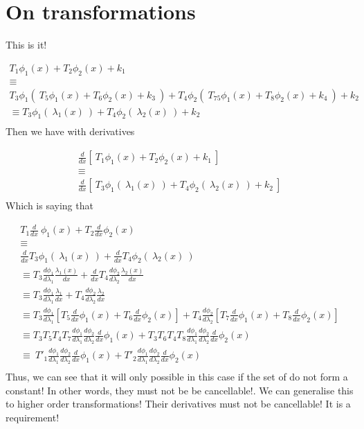 \documentclass[11pt]{article}
\begin{document}
\section{On transformations}
This is it!

\begin{gather*}
    T_{1} \phi _{1}( x) +T_{2} \phi _{2}( x) +k_{1}\\
    \equiv \\
    T_{3} \phi _{1}( \ T_{5} \phi _{1}( x) +T_{6} \phi _{2}( x) +k_{3} \ ) +T_{4} \phi _{2}( \ T_{75} \phi _{1}( x) +T_{8} \phi _{2}( x) +k_{4} \ ) +k_{2}\\
    \equiv T_{3} \phi _{1}( \ \lambda _{1}( x) \ ) +T_{4} \phi _{2}( \ \lambda _{2}( x) \ ) +k_{2}\\
\end{gather*}
Then we have with derivatives

\begin{gather*}
    \frac{d}{dx}[ \ T_{1} \phi _{1}( x) +T_{2} \phi _{2}( x) +k_{1} \ ]\\
    \equiv \\
    \frac{d}{dx}[ \ T_{3} \phi _{1}( \ \lambda _{1}( x) \ ) +T_{4} \phi _{2}( \ \lambda _{2}( x) \ ) +k_{2} \ ]\\
\end{gather*}
Which is saying that

\begin{gather*}
    T_{1}\frac{d}{dx} \ \phi _{1}( x) +T_{2}\frac{d}{dx} \phi _{2}( x)\\
    \equiv \\
    \frac{d}{dx} T_{3} \phi _{1}( \ \lambda _{1}( x) \ ) +\frac{d}{dx} T_{4} \phi _{2}( \ \lambda _{2}( x) \ )\\
    \equiv T_{3}\frac{d\phi _{1}}{d\lambda _{1}}\frac{\lambda _{1}( x)}{dx} +\frac{d}{dx} T_{4}\frac{d\phi _{2}}{d\lambda _{2}}\frac{\lambda _{2}( x)}{dx}\\
    \equiv T_{3}\frac{d\phi _{1}}{d\lambda _{1}}\frac{\lambda _{1}}{dx} +T_{4}\frac{d\phi _{2}}{d\lambda _{2}}\frac{\lambda _{2}}{dx}\\
    \equiv T_{3}\frac{d\phi _{1}}{d\lambda _{1}}\left[ T_{5}\frac{d}{dx} \phi _{1}( x) +T_{6}\frac{d}{dx} \phi _{2}( x)\right] +T_{4}\frac{d\phi _{2}}{d\lambda _{2}}\left[ T_{7}\frac{d}{dx} \phi _{1}( x) +T_{8}\frac{d}{dx} \phi _{2}( x)\right]\\
    \equiv T_{3} T_{5} T_{4} T_{7}\frac{d\phi _{1}}{d\lambda _{1}}\frac{d\phi _{2}}{d\lambda _{2}}\frac{d}{dx} \phi _{1}( x) +T_{3} T_{6} T_{4} T_{8}\frac{d\phi _{1}}{d\lambda _{1}}\frac{d\phi _{2}}{d\lambda _{2}}\frac{d}{dx} \phi _{2}( x)\\
    \equiv \ T'_{1}\frac{d\phi _{1}}{d\lambda _{1}}\frac{d\phi _{2}}{d\lambda _{2}}\frac{d}{dx} \phi _{1}( x) +T'_{2}\frac{d\phi _{1}}{d\lambda _{1}}\frac{d\phi _{2}}{d\lambda _{2}}\frac{d}{dx} \phi _{2}( x)\\
\end{gather*}
Thus, we can see that it will only possible in this case if the set of do not form a constant!
In other words, they must not be be cancellable!. We can generalise this to higher order transformations! Their derivatives must not be cancellable! It is a requirement!



\end{document}
